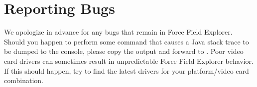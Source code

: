 \documentclass[letterpaper,11pt,english]{sphinxmanual}
\begin{document}
\section{Reporting Bugs}
\label{\detokenize{text/acknowledgements:reporting-bugs}}
We apologize in advance for any bugs that remain in Force Field Explorer. Should you happen to perform some command that causes a Java stack trace to be dumped to the console, please copy the output and forward to . Poor video card drivers can sometimes result in unpredictable Force Field Explorer behavior. If this should happen, try to find the latest drivers for your platform/video card combination.



\renewcommand{\indexname}{Index}
\printindex
\end{document}
